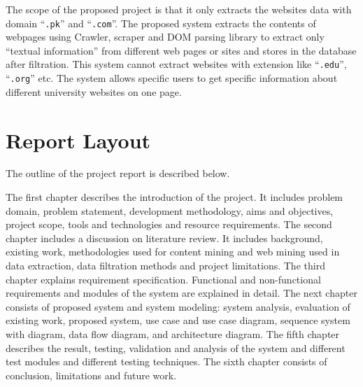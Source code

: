The scope of the proposed project is that it only extracts the websites data with domain ``\texttt{.pk}'' and ``\texttt{.com}''. The proposed system extracts the contents of webpages using Crawler, scraper and DOM parsing library to extract only ``textual information'' from different web pages or sites and stores in the database after filtration. This system cannot extract websites with extension like ``\texttt{.edu}'', ``\texttt{.org}'' etc. The system allows specific users to get specific information about different university websites on one page.

\section{Report Layout}

The outline of the project report is described below.

The first chapter describes the introduction of the project. It includes problem domain, problem statement, development methodology, aims and objectives, project scope, tools and technologies and resource requirements. The second chapter includes a discussion on literature review. It includes background, existing work, methodologies used for content mining and web mining used in data extraction, data filtration methods and project limitations. The third chapter explains requirement specification. Functional and non-functional requirements and modules of the system are explained in detail. The next chapter consists of proposed system and system modeling: system analysis, evaluation of existing work, proposed system, use case and use case diagram, sequence system with diagram, data flow diagram, and architecture diagram. The fifth chapter describes the result, testing, validation and analysis of the system and different test modules and different testing techniques. The sixth chapter consists of conclusion, limitations and future work.
